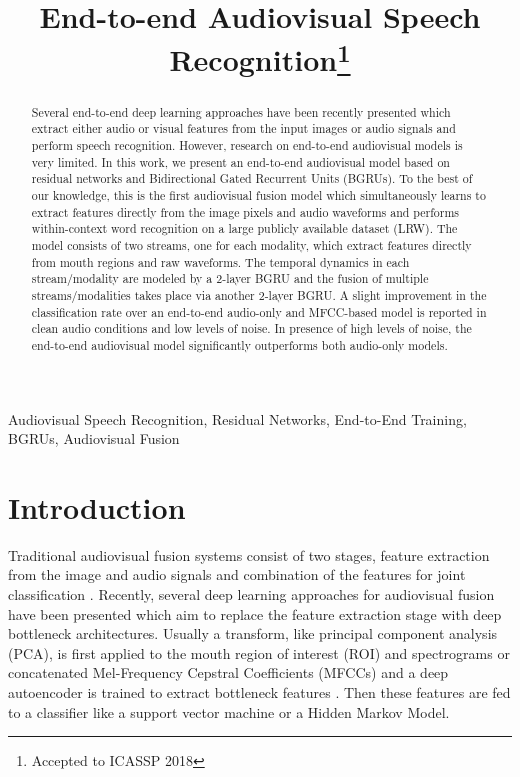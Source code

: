 \documentclass{article}
\title{End-to-end Audiovisual Speech Recognition\thanks{Accepted to ICASSP 2018}}
\begin{document}
\maketitle
\begin{abstract}
Several end-to-end deep learning approaches have been recently presented which extract either audio or visual features from the input images or audio signals and perform speech recognition. However, research on end-to-end audiovisual models is very limited. In this work, we present an end-to-end audiovisual model based on residual networks and Bidirectional Gated Recurrent Units (BGRUs). To the best of our knowledge, this is the first audiovisual fusion model which simultaneously learns to extract features directly from the image pixels and audio waveforms and performs within-context word recognition on a large publicly available dataset (LRW).  The model consists of two streams, one for each modality, which extract features directly from mouth regions and raw waveforms. The temporal dynamics in each stream/modality are modeled by a 2-layer BGRU and the fusion of multiple streams/modalities takes place via another 2-layer BGRU. A slight improvement in the classification rate over an end-to-end audio-only and MFCC-based model is reported in clean audio conditions and low levels of noise. In presence of high levels of noise, the end-to-end audiovisual model significantly outperforms both audio-only models.
\end{abstract}
\begin{keywords}
Audiovisual Speech Recognition, Residual Networks, End-to-End Training, BGRUs, Audiovisual Fusion
\end{keywords}
\section{Introduction}
\label{sec:intro}

Traditional audiovisual fusion systems consist of two stages, feature extraction from the image and audio signals and combination of the features for joint classification \cite{Potamianos2003,Dupont2000,predBasedAVfusion}. Recently, several deep learning approaches for audiovisual fusion have been presented which aim to replace the feature extraction stage with deep bottleneck architectures. Usually a transform, like principal component analysis (PCA), is first applied to the mouth region of interest (ROI) and spectrograms or concatenated Mel-Frequency Cepstral Coefficients (MFCCs) and a deep autoencoder is trained to extract bottleneck features \cite{ngiam2011multimodal,hu2016temporal,ninomiya2015integration,mroueh2015,takashima2016audio,petridisPantic_icassp2016}. Then these features are fed to a classifier like a support vector machine or a Hidden Markov Model. 
\end{document}
